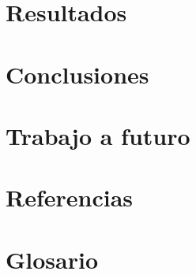 \documentclass[oneside,10pt]{book}
\begin{document}
\chapter{Resultados}

\chapter{Conclusiones}

\chapter{Trabajo a futuro}

\chapter{Referencias}

\chapter{Glosario}
\end{document}
